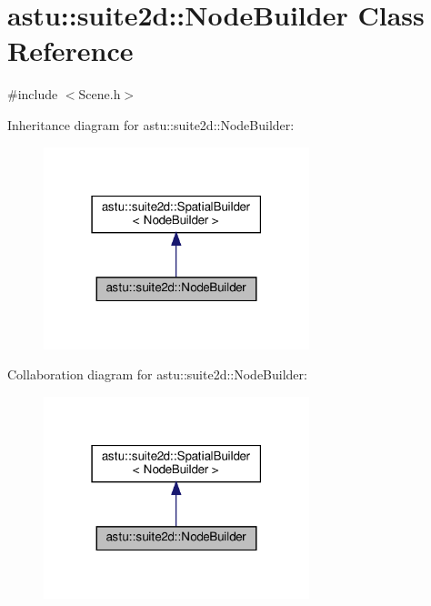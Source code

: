 \hypertarget{classastu_1_1suite2d_1_1NodeBuilder}{}\section{astu\+:\+:suite2d\+:\+:Node\+Builder Class Reference}
\label{classastu_1_1suite2d_1_1NodeBuilder}


{\ttfamily \#include $<$Scene.\+h$>$}



Inheritance diagram for astu\+:\+:suite2d\+:\+:Node\+Builder\+:\nopagebreak
\begin{figure}[H]
\begin{center}
\leavevmode
\includegraphics[width=219pt]{classastu_1_1suite2d_1_1NodeBuilder__inherit__graph}
\end{center}
\end{figure}


Collaboration diagram for astu\+:\+:suite2d\+:\+:Node\+Builder\+:\nopagebreak
\begin{figure}[H]
\begin{center}
\leavevmode
\includegraphics[width=219pt]{classastu_1_1suite2d_1_1NodeBuilder__coll__graph}
\end{center}
\end{figure}
